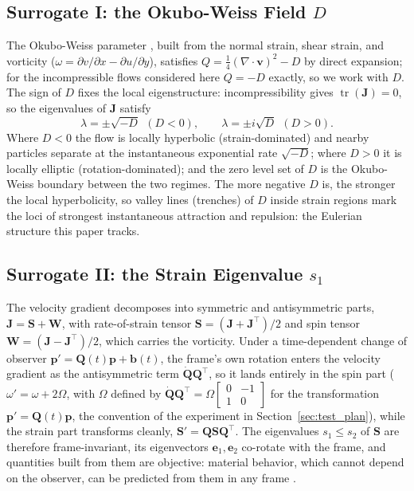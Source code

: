 \documentclass[lettersize,journal]{IEEEtran}
\begin{document}
\subsection{Surrogate I: the Okubo-Weiss Field $D$}

The Okubo-Weiss parameter \cite{21,22}, built from the normal strain,
shear strain, and vorticity
($\omega = \partial v/\partial x - \partial u/\partial y$), satisfies
$Q = \tfrac{1}{4}(\nabla \cdot \mathbf{v})^2 - D$ by direct expansion;
for the incompressible flows considered here $Q = -D$ exactly, so we
work with $D$. The sign of $D$ fixes the local eigenstructure:
incompressibility gives $\operatorname{tr}(\mathbf{J}) = 0$, so the
eigenvalues of $\mathbf{J}$ satisfy
\begin{equation}
    \lambda = \pm\sqrt{-D} \ \ (D < 0), \qquad
    \lambda = \pm i\sqrt{D} \ \ (D > 0).
    \label{eq:eig_detj}
\end{equation}
Where $D < 0$ the flow is locally hyperbolic (strain-dominated) and
nearby particles separate at the instantaneous exponential rate
$\sqrt{-D}$; where $D > 0$ it is locally elliptic (rotation-dominated);
and the zero level set of $D$ is the Okubo-Weiss boundary between the
two regimes. The more negative $D$ is, the stronger the local
hyperbolicity, so valley lines (trenches) of $D$ inside strain regions
mark the loci of strongest instantaneous attraction and repulsion: the
Eulerian structure this paper tracks.

\subsection{Surrogate II: the Strain Eigenvalue $s_1$}
\label{sec:strain_field}

The velocity gradient decomposes into symmetric and antisymmetric
parts, $\mathbf{J} = \mathbf{S} + \mathbf{W}$, with rate-of-strain
tensor $\mathbf{S} = (\mathbf{J} + \mathbf{J}^\top)/2$ and spin tensor
$\mathbf{W} = (\mathbf{J} - \mathbf{J}^\top)/2$, which carries the
vorticity. Under a time-dependent change of observer $\mathbf{p}' =
\mathbf{Q}(t)\mathbf{p} + \mathbf{b}(t)$, the frame's own rotation
enters the velocity gradient as the antisymmetric term
$\dot{\mathbf{Q}}\mathbf{Q}^\top$, so it lands entirely in the spin
part ($\omega' = \omega + 2\Omega$, with $\Omega$ defined by
$\dot{\mathbf{Q}}\mathbf{Q}^\top = \Omega\left[\begin{smallmatrix} 0 &
-1 \\ 1 & 0 \end{smallmatrix}\right]$ for the transformation
$\mathbf{p}' = \mathbf{Q}(t)\mathbf{p}$, the convention of the
experiment in Section~\ref{sec:test_plan}), while the strain part
transforms cleanly, $\mathbf{S}' =
\mathbf{Q}\mathbf{S}\mathbf{Q}^\top$. The eigenvalues $s_1 \leq s_2$ of
$\mathbf{S}$ are therefore frame-invariant, its eigenvectors
$\mathbf{e}_1, \mathbf{e}_2$ co-rotate with the frame, and quantities
built from them are objective: material behavior, which cannot depend
on the observer, can be predicted from them in any frame \cite{16,17}.
\end{document}
